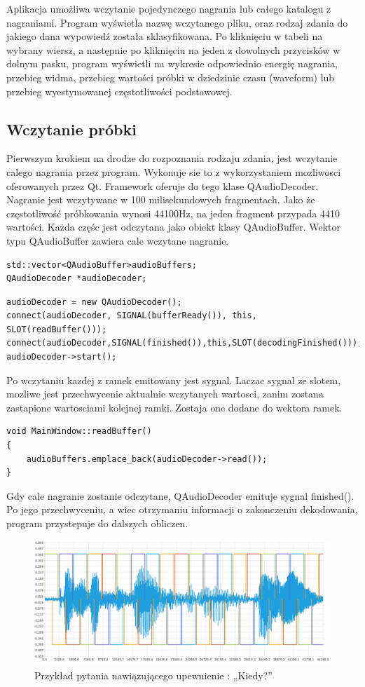 \documentclass[a4paper,12 pt]{article}
\begin{document}
Aplikacja umożliwa wczytanie pojedynczego nagrania lub całego katalogu z nagraniami. Program wyświetla nazwę wczytanego pliku, oraz rodzaj zdania do jakiego dana wypowiedź została sklasyfikowana. Po kliknięciu w tabeli na wybrany wiersz, a następnie po kliknięciu na jeden z dowolnych przycisków w dolnym pasku, program wyświetli na wykresie odpowiednio energię nagrania, przebieg widma, przebieg wartości próbki w dziedzinie czasu (waveform) lub przebieg wyestymowanej częstotliwości podstawowej.

\subsection{Wczytanie próbki}
Pierwszym krokiem na drodze do rozpoznania rodzaju zdania, jest wczytanie calego nagrania przez program. Wykonuje sie to z wykorzystaniem mozliwosci oferowanych przez Qt. Framework oferuje do tego klase QAudioDecoder. 
Nagranie jest wczytywane w 100 milisekundowych fragmentach. Jako że częstotliwość próbkowania wynosi 44100Hz, na jeden fragment przypada 4410 wartości. Każda częśc jest odczytana jako obiekt klasy QAudioBuffer. Wektor typu QAudioBuffer zawiera cale wczytane nagranie.
\begin{lstlisting}
std::vector<QAudioBuffer>audioBuffers;
QAudioDecoder *audioDecoder;
\end{lstlisting}
\begin{lstlisting}
audioDecoder = new QAudioDecoder();
connect(audioDecoder, SIGNAL(bufferReady()), this, SLOT(readBuffer()));
connect(audioDecoder,SIGNAL(finished()),this,SLOT(decodingFinished()));
audioDecoder->start();
\end{lstlisting}
Po wczytaniu kazdej z ramek emitowany jest sygnal. Laczac sygnal ze slotem, mozliwe jest przechwycenie aktualnie wczytanych wartosci, zanim zostana zastapione wartosciami kolejnej ramki.
Zostaja one dodane do wektora ramek.
\begin{lstlisting}
void MainWindow::readBuffer()
{
    audioBuffers.emplace_back(audioDecoder->read());
}
\end{lstlisting}
Gdy cale nagranie zostanie odczytane, QAudioDecoder emituje sygnal finished(). Po jego przechwyceniu, a wiec otrzymaniu informacji o zakonczeniu dekodowania, program przystepuje do dalszych obliczen.
\begin{figure}[h]

\centering
\includegraphics[scale=0.7]{overlapping.png}
\caption{Przykład pytania nawiązującego upewnienie : „Kiedy?”}

\end{figure}
\end{document}

